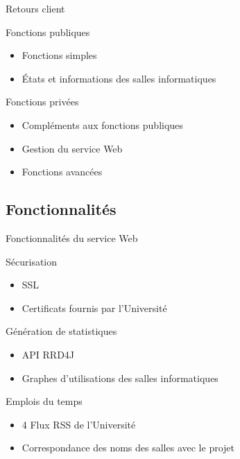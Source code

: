 \begin{frame}{Retours client}
	\begin{block}{Fonctions publiques}
		\begin{itemize}
			\item Fonctions simples
			\item \'Etats et informations des salles informatiques
			
		\end{itemize}

	\end{block}
	
	\begin{block}{Fonctions priv\'ees}
		\begin{itemize}
			\item Compl\'ements aux fonctions publiques
			\item Gestion du service Web 
			\item Fonctions avanc\'ees
			
		\end{itemize}

	\end{block}

\end{frame}


\subsection{Fonctionnalit\'es}

\begin{frame}{Fonctionnalit\'es du service Web}
	\begin{block}{S\'ecurisation}
		\begin{itemize}
			\item SSL
			\item Certificats fournis par l'Universit\'e
			
		\end{itemize}

	\end{block}
	
	\begin{block}{G\'en\'eration de statistiques}
		\begin{itemize}
			\item API RRD4J
			\item Graphes d'utilisations des salles informatiques
			
		\end{itemize}

	\end{block}
	
	\begin{block}{Emplois du temps}
		\begin{itemize}
			\item 4 Flux RSS de l'Universit\'e
			\item Correspondance des noms des salles avec le projet
			
		\end{itemize}

	\end{block}
	
\end{frame}

